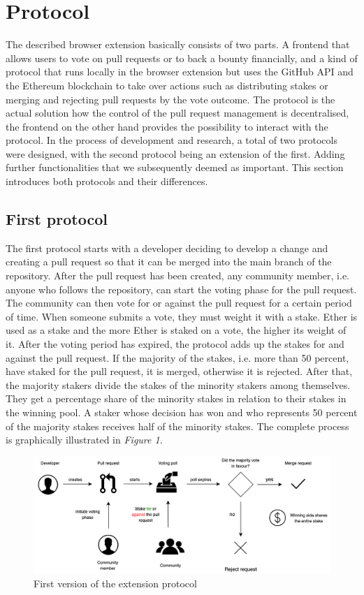 \documentclass[sigconf]{acmart}
\begin{document}
\section{Protocol}
The described browser extension basically consists of two parts. A frontend that allows users to vote on pull requests or to back 
a bounty financially, and a kind of protocol that runs locally in the browser extension but uses the GitHub API and the Ethereum 
blockchain to take over actions such as distributing stakes or merging and rejecting pull requests by the vote outcome.
The protocol is the actual solution how the control of the pull request management is decentralised, the frontend on the 
other hand provides the possibility to interact with the protocol. In the process of development and research, a total of two 
protocols were designed, with the second protocol being an extension of the first. Adding further functionalities that we 
subsequently deemed as important. This section introduces both protocols and their differences.

\subsection{First protocol}
The first protocol starts with a developer deciding to develop a change and creating a pull request so that it can be merged into the 
main branch of the repository. After the pull request has been created, any community member, i.e. anyone who follows the repository, 
can start the voting phase for the pull request. The community can then vote for or against the pull request for a certain period of time.
When someone submits a vote, they must weight it with a stake. Ether is used as a stake and the more Ether is staked on a vote, 
the higher its weight of it. After the voting period has expired, the protocol adds up the stakes for and against the pull request.
If the majority of the stakes, i.e. more than 50 percent, have staked for the pull request, it is merged, otherwise it is rejected.
After that, the majority stakers divide the stakes of the minority stakers among themselves. They get a percentage share of the minority 
stakes in relation to their stakes in the winning pool. A staker whose decision has won and who represents 50 percent of the majority 
stakes receives half of the minority stakes. The complete process is graphically illustrated in \textit{Figure 1}.

\begin{figure}[h]
	\centering
	\includegraphics[width=140mm]{images/firstprotocol.png}
	\caption{First version of the extension protocol}
	\label{fig:arch-firstprotocol}
\end{figure}
\end{document}
